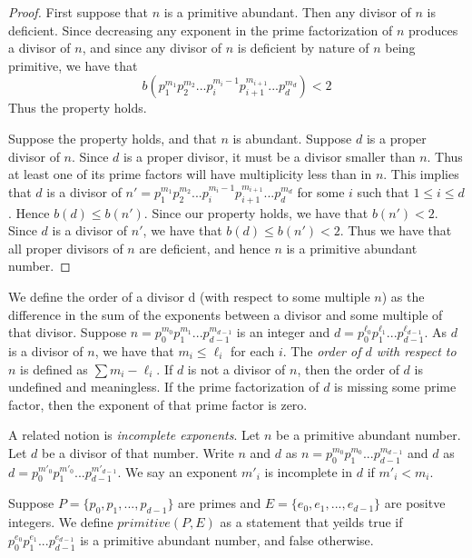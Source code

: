 \documentclass[../paper.tex]{subfiles}
\begin{document}
\begin{proof}
	First suppose that $n$ is a primitive abundant. Then any divisor of $n$
is deficient. Since decreasing any exponent in the prime 
factorization of $n$ produces a divisor of $n$, and since any
divisor of $n$ is deficient by nature of $n$ being primitive,
we have that 
$$b(p_1^{m_1} p_2^{m_2} ...   p_i^{m_i - 1} p_{i+1}^{m_{i+1}}
... p_d^{m_d}) < 2$$
Thus the property holds.

	Suppose the property holds, and that $n$ is abundant. Suppose $d$
is a proper divisor of $n$. Since $d$ is a proper divisor, it must
be a divisor smaller than $n$. Thus at least one of its prime factors
will have multiplicity less than in $n$. This implies that $d$ is a 
divisor of
$n' = p_1^{m_1} p_2^{m_2} ...   p_i^{m_i - 1} p_{i+1}^{m_{i+1}}
... p_d^{m_d}$ 
for some $i$ such that $1 \leq i \leq d$. Hence $b(d) \leq b(n')$.
Since our property holds, we have that $b(n') < 2$. Since $d$ is
a divisor of $n'$, we have that $b(d) \leq b(n') < 2$. Thus we
have that all proper divisors of $n$ are deficient, and hence $n$ is 
a primitive abundant number.
\end{proof}

We define the order of a divisor d (with respect to some multiple
$n$) as the difference in the sum of the exponents between a
divisor and some multiple of that divisor. Suppose $n = p_0^{m_0}
p_1^{m_1} ... p_{d-1}^{m_{d-1}}$ is an integer and $d = p_0^{\ell_0}
p_1^{\ell_1} ... p_{d-1}^{\ell_{d-1}}$. As $d$ is a divisor of
$n$, we have that $m_i \leq \ell_i$ for each $i$. The
\textit{order of $d$ with respect to $n$} is defined as $\sum {m_i
- \ell_i}$. If $d$ is not a divisor of $n$, then the order of $d$
is undefined and meaningless. If the prime factorization of $d$ is
missing some prime factor, then the exponent of that prime factor
is zero.

A related notion is \textit{incomplete exponents}. Let $n$ be a
primitive abundant number. Let $d$ be a divisor of that number.
Write $n$ and $d$ as $n = p_0^{m_0} p_1^{m_0}...
p_{d-1}^{m_{d-1}}$ and $d$ as $d = p_0^{m'_0} p_1^{m'_0} ...
p_{d-1}^{m'_{d-1}}$. We say an exponent $m'_i$ is incomplete in
$d$ if $m'_i < m_i$. 

Suppose $P = \{p_0, p_1, ...,p_{d-1}\}$ are primes and 
$E = \{e_0, e_1, ..., e_{d-1} \}$ are positve integers.
We define $primitive(P,E)$ as a statement that yeilds true
if $p_0^{e_0} p_1^{e_1} ... p_{d-1}^{e_{d-1}}$ is a primitive
abundant number, and false otherwise.
\end{document}
